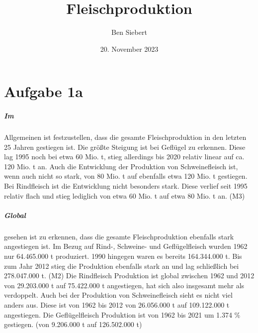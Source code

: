 \documentclass[11pt,a4paper]{report}
\begin{document}
	\bsremovechaptertitle
	
	\title{Fleischproduktion}
	\author{Ben Siebert}
	\date{20. November 2023}
	
	\maketitle
	
	\chapter{Aufgabe 1a}
	
	\paragraph{Im} Allgemeinen ist festzustellen, dass die gesamte Fleischproduktion in den letzten 25 Jahren gestiegen ist.
	Die größte Steigung ist bei Geflügel zu erkennen.
	Diese lag 1995 noch bei etwa 60 Mio. t, stieg allerdings bis 2020 relativ linear auf ca. 120 Mio. t an.
	Auch die Entwicklung der Produktion von Schweinefleisch ist, wenn auch nicht so stark, von 80 Mio. t auf ebenfalls etwa 120 Mio. t gestiegen.
	Bei Rindfleisch ist die Entwicklung nicht besonders stark.
	Diese verlief seit 1995 relativ flach und stieg lediglich von etwa 60 Mio. t auf etwa 80 Mio. t an. (M3)
	\paragraph{Global} gesehen ist zu erkennen, dass die gesamte Fleischproduktion ebenfalls stark angestiegen ist.
	Im Bezug auf Rind-, Schweine- und Geflügelfleisch wurden 1962 nur 64.465.000 t produziert.
	1990 hingegen waren es bereits 164.344.000 t.
	Bis zum Jahr 2012 stieg die Produktion ebenfalls stark an und lag schließlich bei 278.047.000 t. (M2)
	Die Rindfleisch Produktion ist global zwischen 1962 und 2012 von 29.203.000 t auf 75.422.000 t angestiegen, hat sich also insgesamt mehr als verdoppelt. Auch bei der Produktion von Schweinefleisch sieht es nicht viel anders aus. Diese ist von 1962 bis 2012 von 26.056.000 t auf 109.122.000 t angestiegen.
	Die Geflügelfleisch Produktion ist von 1962 bis 2021 um 1.374 \% gestiegen. (von 9.206.000 t auf 126.502.000 t)
	
	\newpage
	
\end{document}
